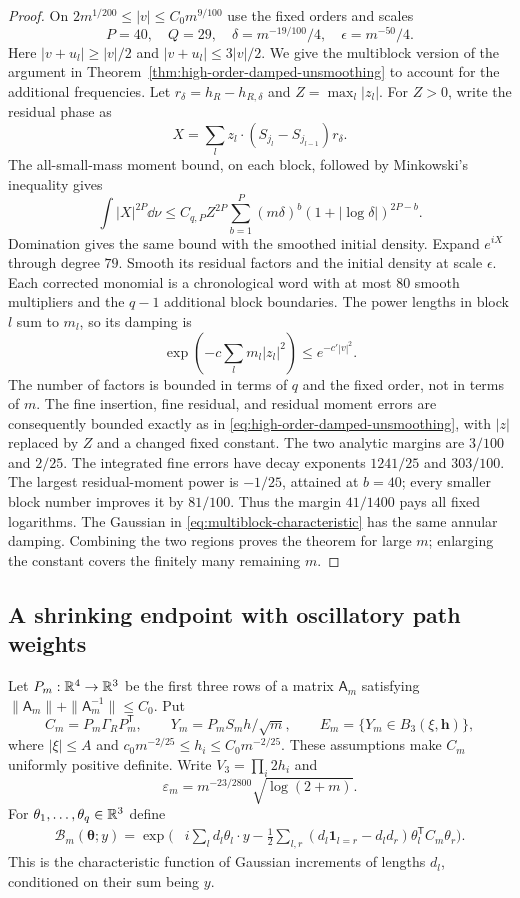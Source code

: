 \begin{proof}
On $2m^{1/200}\le|v|\le C_0m^{9/100}$ use the fixed orders and
scales
\[
 P=40,\quad Q=29,\quad \delta=m^{-19/100}/4,
                   \quad\epsilon=m^{-50}/4.
\]
Here $|v+u_l|\ge|v|/2$ and $|v+u_l|\le3|v|/2$. We give the
multiblock version of the argument in
Theorem~\ref{thm:high-order-damped-unsmoothing} to account for the
additional frequencies. Let $r_\delta=h_R-h_{R,\delta}$ and
$Z=\max_l|z_l|$. For $Z>0$, write the residual phase as
\[
 X=\sum_l z_l\cdot(S_{j_l}-S_{j_{l-1}})r_\delta.
\]
The all-small-mass moment bound, on each block, followed by
Minkowski's inequality gives
\[
 \int|X|^{2P}\dd\nu
       \le C_{q,P}Z^{2P}\sum_{b=1}^P(m\delta)^b
                                (1+|\log\delta|)^{2P-b}.
\]
Domination gives the same bound with the smoothed initial density.
Expand $e^{iX}$ through degree $79$. Smooth its residual factors
and the initial density at scale $\epsilon$. Each corrected monomial
is a chronological word with at most $80$ smooth multipliers and the
$q-1$ additional block boundaries. The power lengths in block $l$
sum to $m_l$, so its damping is
\[
 \exp\left(-c\sum_l m_l|z_l|^2\right)
                                      \le e^{-c'|v|^2}.
\]
The number of factors is bounded in terms of $q$ and the fixed order,
not in terms of $m$. The fine insertion, fine residual, and residual
moment errors are consequently bounded exactly as in
\eqref{eq:high-order-damped-unsmoothing}, with $|z|$ replaced by $Z$
and a changed fixed constant. The two analytic margins are $3/100$
and $2/25$. The integrated fine errors have decay exponents
$1241/25$ and $303/100$. The largest residual-moment power is
$-1/25$, attained at $b=40$; every smaller block number improves it
by $81/100$. Thus the margin $41/1400$ pays all fixed logarithms.
The Gaussian in \eqref{eq:multiblock-characteristic} has the same
annular damping. Combining the two regions proves the theorem for
large $m$; enlarging the constant covers the finitely many remaining $m$.
\end{proof}

\subsection{A shrinking endpoint with oscillatory path weights}
Let $P_m:\mathbb R^4\to\mathbb R^3$ be the first three rows of a matrix
$\mathsf A_m$ satisfying
$\|\mathsf A_m\|+\|\mathsf A_m^{-1}\|\le C_0$. Put
\[
 C_m=P_m\Gamma_RP_m^{\mathsf T},\qquad
 Y_m=P_mS_mh/\sqrt m,\qquad
 E_m=\{Y_m\in B_3(\xi,\mathbf h)\},
\]
where $|\xi|\le A$ and
$c_0m^{-2/25}\le h_i\le C_0m^{-2/25}$. These assumptions make
$C_m$ uniformly positive definite. Write $V_3=\prod_i2h_i$ and
\[
 \varepsilon_m=m^{-23/2800}\sqrt{\log(2+m)}.
\]
For $\theta_1,\ldots,\theta_q\in\mathbb R^3$ define
\begin{align}
 \mathcal B_m(\boldsymbol\theta;y)
 =\exp\biggl(&i\sum_l d_l\theta_l\cdot y
 -\frac12\sum_{l,r}(d_l\mathbf1_{l=r}-d_ld_r)
                         \theta_l^{\mathsf T}C_m\theta_r\biggr).
 \label{eq:bridge-increment-characteristic}
\end{align}
This is the characteristic function of Gaussian increments of lengths
$d_l$, conditioned on their sum being $y$.

